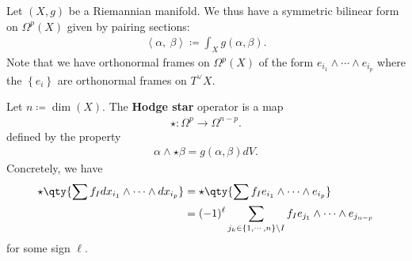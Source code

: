 \begin{remark}

Let \((X, g)\) be a Riemannian manifold. We thus have a symmetric
bilinear form on \(\Omega^p(X)\) given by pairing sections:
\begin{align*}
{\left\langle { \alpha},~{ \beta} \right\rangle} \coloneqq\int_X g( \alpha, \beta)
.\end{align*}
Note that we have orthonormal frames on \(\Omega^p(X)\) of the form
\(e_{i_1} \wedge \cdots \wedge e_{i_p}\) where the
\(\left\{{ e_i }\right\}\) are orthonormal frames on \(T^\vee X\).

\end{remark}

\begin{definition}

Let \(n\coloneqq\dim(X)\). The \textbf{Hodge star} operator is a map
\begin{align*}
\star: \Omega^p \to \Omega^{n-p}
.\end{align*}
defined by the property
\begin{align*}
\alpha\wedge \star\beta= g( \alpha, \beta) dV
.\end{align*}
Concretely, we have
\begin{align*}
\star\qty{ \sum f_I dx_{i_1} \wedge \cdots \wedge dx_{i_p} } 
&= \star\qty{ \sum f_I e_{i_1} \wedge \cdots \wedge e_{i_p} } \\
&= (-1)^\ell \sum_{j_k \in \left\{{ 1, \cdots, n }\right\} \setminus I} f_I e_{j_1} \wedge \cdots \wedge e_{j_{n-p}}
\end{align*}
for some sign \(\ell\).

\end{definition}

